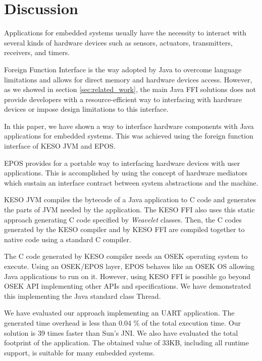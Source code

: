 \documentclass[12pt]{article} %
\begin{document}
\section{Discussion}
\label{sec:discussion}
	Applications for embedded systems usually have the necessity to interact
with several kinds of hardware devices such as sensors, actuators, transmitters,
receivers, and timers. 

	Foreign Function Interface is the way adopted by Java to overcome language
limitations and allows for direct memory and hardware devices access. However,
as we showed in section \ref{sec:related_work}, the main Java FFI solutions 
does not provide developers with a resource-efficient way to interfacing with
hardware devices or impose design limitations to this interface.

	In this paper, we have shown a way to interface hardware components with
Java applications for embedded systems. This was achieved using the foreign
function interface of KESO JVM and EPOS.

	EPOS provides for a portable way to interfacing hardware devices with user
applications. This is accomplished by using the concept of hardware mediators
which sustain an interface contract between system abstractions and the machine.

	KESO JVM compiles the bytecode of a Java application to C code and generates 
the parts of JVM needed by the application. The KESO FFI also uses this static
approach generating C code specified by \emph{Weavelet} classes. Then, the C codes
generated by the KESO compiler and by KESO FFI are compiled together to native code
using a standard C compiler. 

	The C code generated by KESO compiler needs an
OSEK operating system to execute. Using an OSEK/EPOS layer, EPOS behaves like an
OSEK OS allowing Java applications to run on it. However, using KESO FFI is 
possible go beyond OSEK API implementing other APIs and specifications. We 
have demonstrated this implementing the Java standard class Thread.

	We have evaluated our approach implementing an UART application. The generated time overhead is less than 0.04 \% of the total execution time. Our solution is 39 times faster than Sun's JNI. We also have evaluated the total footprint of the application. The obtained value of 33KB, including all runtime support, is suitable for many embedded systems.



\end{document}
